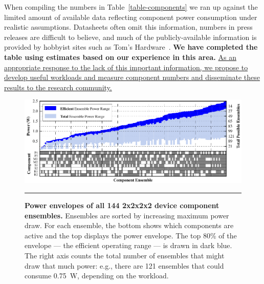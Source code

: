 When compiling the numbers in Table~\ref{table-components} we ran up against
the limited amount of available data reflecting component power consumption
under realistic assumptions. Datasheets often omit this information, numbers
in press releases are difficult to believe, and much of the
publicly-available information is provided by hobbyist sites such as Tom's
Hardware~\cite{tomshardware-www}. \textbf{We have completed the table using
estimates based on our experience in this area.} \uline{As an appropriate
response to the lack of this important information, we propose to develop
useful workloads and measure component numbers and disseminate these results
to the research community.}

\begin{figure}[t]
\centering
\includegraphics{./figures/componentgraph.pdf}

\caption{\small \textbf{Power envelopes of all 144 2x2x2x2 device component
ensembles.} Ensembles are sorted by increasing maximum power draw. For each
ensemble, the bottom shows which components are active and the top displays
the power envelope. The top 80\% of the envelope --- the efficient operating
range --- is drawn in dark blue. The right axis counts the total number of
ensembles that might draw that much power: e.g., there are
121 ensembles that could consume 0.75~W, depending on the workload.}
\vspace{0.10in}
\hrule
\vspace{-0.20in}
\label{figure-componentgraph}
\end{figure}

